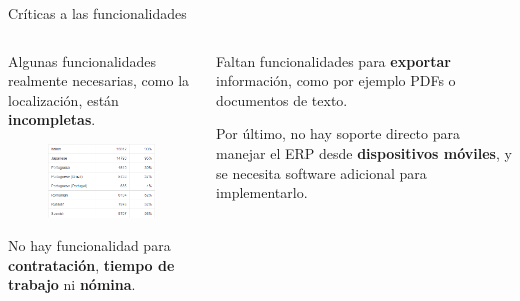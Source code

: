 \begin{frame}{Críticas a las funcionalidades}
\begin{columns}[T]
	
	\begin{column}{.5\textwidth}
		\justifying
		Algunas funcionalidades realmente necesarias, como la localización, están \textbf{incompletas}.
		\begin{figure}[H]
			\centering
			\includegraphics[width=0.8\linewidth, height=0.5\linewidth]{img/localisation.png}
			
		\end{figure}
		
		No hay funcionalidad para \textbf{contratación}, \textbf{tiempo de trabajo} ni \textbf{nómina}. 
	\end{column}
	\begin{column}{.5\textwidth}
		Faltan funcionalidades para \textbf{exportar} información, como por ejemplo PDFs o documentos de texto.
		\vspace{.5cm}
		
			
		\vspace{.5cm}
		
		Por último, no hay soporte directo para manejar el ERP desde \textbf{dispositivos móviles}, y se necesita software adicional para implementarlo.
	\end{column}
	
\end{columns}
	
\end{frame}

